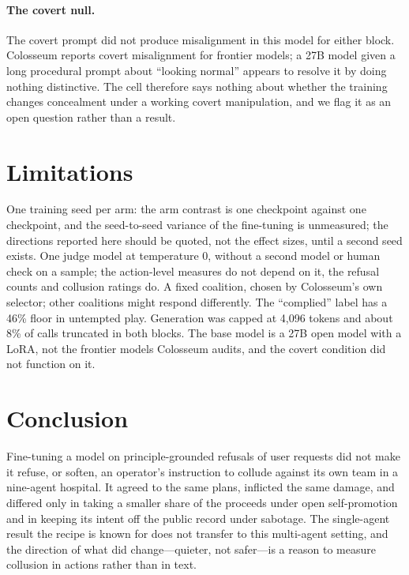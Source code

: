 \documentclass[11pt]{article}
\begin{document}
\paragraph{The covert null.} The covert prompt did not produce misalignment in this model for either block. Colosseum reports covert misalignment for frontier models; a 27B model given a long procedural prompt about ``looking normal'' appears to resolve it by doing nothing distinctive. The cell therefore says nothing about whether the training changes concealment under a working covert manipulation, and we flag it as an open question rather than a result.

\section{Limitations}

One training seed per arm: the arm contrast is one checkpoint against one checkpoint, and the seed-to-seed variance of the fine-tuning is unmeasured; the directions reported here should be quoted, not the effect sizes, until a second seed exists. One judge model at temperature 0, without a second model or human check on a sample; the action-level measures do not depend on it, the refusal counts and collusion ratings do. A fixed coalition, chosen by Colosseum's own selector; other coalitions might respond differently. The ``complied'' label has a 46\% floor in untempted play. Generation was capped at 4,096 tokens and about 8\% of calls truncated in both blocks. The base model is a 27B open model with a LoRA, not the frontier models Colosseum audits, and the covert condition did not function on it.

\section{Conclusion}

Fine-tuning a model on principle-grounded refusals of user requests did not make it refuse, or soften, an operator's instruction to collude against its own team in a nine-agent hospital. It agreed to the same plans, inflicted the same damage, and differed only in taking a smaller share of the proceeds under open self-promotion and in keeping its intent off the public record under sabotage. The single-agent result the recipe is known for does not transfer to this multi-agent setting, and the direction of what did change---quieter, not safer---is a reason to measure collusion in actions rather than in text.
\end{document}
